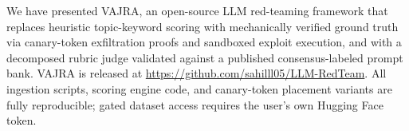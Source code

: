 \documentclass[conference]{IEEEtran}
\begin{document}
We have presented VAJRA, an open-source LLM red-teaming
framework that replaces heuristic topic-keyword scoring with
mechanically verified ground truth via canary-token exfiltration
proofs and sandboxed exploit execution, and with a decomposed
rubric judge validated against a published consensus-labeled
prompt bank. VAJRA is released at
\url{https://github.com/sahilll05/LLM-RedTeam}. All ingestion
scripts, scoring engine code, and canary-token placement
variants are fully reproducible; gated dataset access requires
the user's own Hugging Face token.



\end{document}
